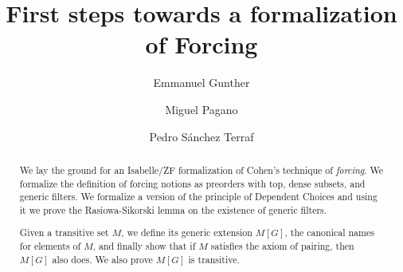 \documentclass{article}
\begin{document}
\title{First steps towards a formalization of Forcing}
\author{Emmanuel Gunther
  \and 
  Miguel Pagano
  \and 
  Pedro S\'anchez Terraf}
\maketitle

\begin{abstract} 
  We lay the ground for an Isabelle/ZF formalization of Cohen's technique of
  \emph{forcing}. We formalize the definition of forcing notions as
  preorders with top, dense subsets, and generic filters. We formalize
  a version of the principle of Dependent Choices and using it
  we prove the Rasiowa-Sikorski lemma on the existence of generic filters.
  
  Given a transitive set $M$, we define its generic extension $M[G]$,
  the canonical names for elements of $M$, and finally show that if $M$
  satisfies the axiom of pairing, then $M[G]$ also does. We also prove
  $M[G]$ is transitive.
\end{abstract}



% 






















%
\end{document}
